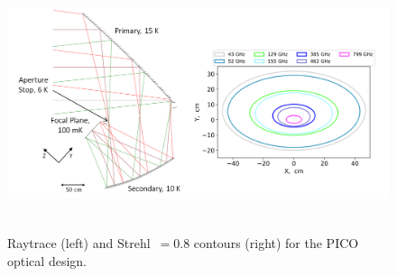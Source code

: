 \documentclass[]{spie}  %
\begin{document}
\begin{figure} [ht]
\begin{center}
\includegraphics[height=7.5cm]{jpl_ray_strehl.png}
\end{center}
\caption { \label{fig:ray} \label{fig:strehl} 
Raytrace (left) and Strehl~$=0.8$ contours (right) for the PICO optical design. }
\vspace{0.2in}
\end{figure} 
\end{document}
